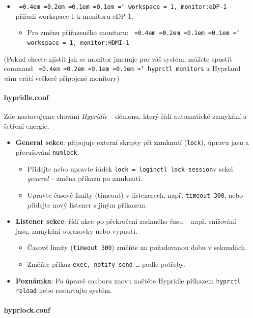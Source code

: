 \documentclass[12pt,a4paper]{article}
\newcommand*\justify{%
  \fontdimen2\font=0.4em%
  \fontdimen3\font=0.2em%
  \fontdimen4\font=0.1em%
  \fontdimen7\font=0.1em%
  \hyphenchar\font=`\-%
}
\begin{document}
\begin{itemize}
  \item \texttt{\justify workspace = 1, monitor:eDP-1} – přiřadí workspace 1 k monitoru eDP‑1.
  \begin{itemize}
    \item Pro změnu přiřazeného monitoru: \texttt{\justify workspace = 1, monitor:HDMI-1}
  \end{itemize}
\end{itemize}

(Pokud chcete zjistit jak se monitor jmenuje pro váš systém, můžete spustit command \texttt{\justify hyprctl monitors}
a Hyprland vám vrátí veškeré připojené monitory)

\paragraph{hypridle.conf}
\label{hypridle.conf}
Zde nastavujeme chování \emph{Hypridle} – démonu, který řídí automatické zamykání a šetření energie.

\begin{itemize}
  \item \textbf{General sekce}: připojuje externí skripty při zamknutí (\verb|lock|), úpravu jasu a přerušování \verb|numlock|.
    \begin{itemize}
      \item Přidejte nebo upravte řádek \verb|lock = loginctl lock-session|v sekci
        \textit{general} – změna příkazu po zamknutí.
      \item Upravte časové limity (timeout) v listenerech, např. \verb|timeout 300|, nebo přidejte 
          nový listener s jiným příkazem.
    \end{itemize}
  \item \textbf{Listener sekce}: řídí akce po překročení zadaného času – např. snižování jasu, zamykání obrazovky nebo vypnutí.
    \begin{itemize}
      \item Časové limity (\verb|timeout 300|) změňte na požadovanou dobu v sekundách.
      \item Změňte příkaz \verb|exec, notify-send …| podle potřeby.
    \end{itemize}
  \item \textbf{Poznámka}: Po úpravě souboru znovu načtěte Hypridle příkazem \verb|hyprctl reload| nebo restartujte systém.
\end{itemize}

\paragraph{hyprlock.conf}
\label{hyprlock.conf}
\end{document}
